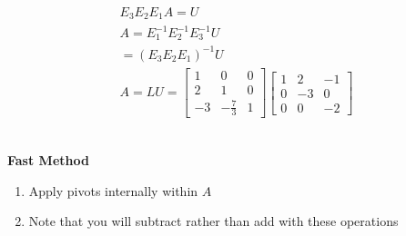 \documentclass[10pt]{article}
\begin{document}
\begin{multicols}{2}
\begin{minipage}{\columnwidth}
\begin{minipage}{0.5\linewidth}
            \begin{align*}
                E_3 E_2 E_1 A = U                \\
                A = E_1^{-1} E_2^{-1} E_3^{-1} U \\
                = (E_3 E_2 E_1)^{-1} U           \\
                A = LU = \begin{bmatrix}
                             1  & 0            & 0 \\
                             2  & 1            & 0 \\
                             -3 & -\frac{7}{3} & 1
                         \end{bmatrix}
                \begin{bmatrix}
                    1 & 2  & -1 \\
                    0 & -3 & 0  \\
                    0 & 0  & -2
                \end{bmatrix}
            \end{align*}
        \end{minipage} \\
        \textbf{Fast Method}
        \begin{enumerate}
            \item Apply pivots internally within \(A\)
            \item Note that you will subtract rather than add with these operations
        \end{enumerate}


\end{minipage}
\end{multicols}
\end{document}
